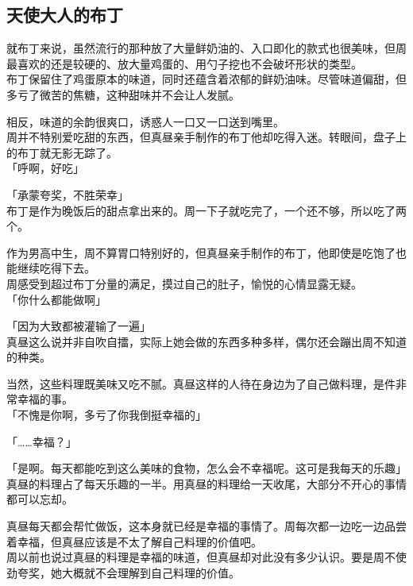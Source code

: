 \subsection{天使大人的布丁}

就布丁来说，虽然流行的那种放了大量鲜奶油的、入口即化的款式也很美味，但周最喜欢的还是较硬的、放大量鸡蛋的、用勺子挖也不会破坏形状的类型。\\

布丁保留住了鸡蛋原本的味道，同时还蕴含着浓郁的鲜奶油味。尽管味道偏甜，但多亏了微苦的焦糖，这种甜味并不会让人发腻。

相反，味道的余韵很爽口，诱惑人一口又一口送到嘴里。\\

周并不特别爱吃甜的东西，但真昼亲手制作的布丁他却吃得入迷。转眼间，盘子上的布丁就无影无踪了。\\

「呼啊，好吃」

「承蒙夸奖，不胜荣幸」\\

布丁是作为晚饭后的甜点拿出来的。周一下子就吃完了，一个还不够，所以吃了两个。

作为男高中生，周不算胃口特别好的，但真昼亲手制作的布丁，他即使是吃饱了也能继续吃得下去。\\

周感受到超过布丁分量的满足，摸过自己的肚子，愉悦的心情显露无疑。\\

「你什么都能做啊」

「因为大致都被灌输了一遍」\\

真昼这么说并非自吹自擂，实际上她会做的东西多种多样，偶尔还会蹦出周不知道的种类。

当然，这些料理既美味又吃不腻。真昼这样的人待在身边为了自己做料理，是件非常幸福的事。\\

「不愧是你啊，多亏了你我倒挺幸福的」

「……幸福？」

「是啊。每天都能吃到这么美味的食物，怎么会不幸福呢。这可是我每天的乐趣」\\

真昼的料理占了每天乐趣的一半。用真昼的料理给一天收尾，大部分不开心的事情都可以忘却。

真昼每天都会帮忙做饭，这本身就已经是幸福的事情了。周每次都一边吃一边品尝着幸福，但真昼应该是不太了解自己料理的价值吧。\\

周以前也说过真昼的料理是幸福的味道，但真昼却对此没有多少认识。要是周不使劲夸奖，她大概就不会理解到自己料理的价值。

